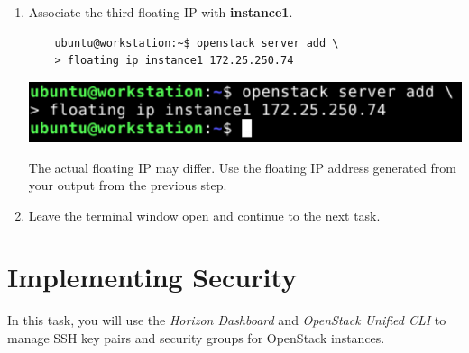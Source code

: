 \documentclass[letterpaper, 12pt]{article}
\begin{document}
\begin{enumerate}
    \item Associate the third floating IP with \textbf{instance1}.
    \begin{lstlisting}
    ubuntu@workstation:~$ openstack server add \
    > floating ip instance1 172.25.250.74
    \end{lstlisting}

    \begin{center}
        \includegraphics[width=\linewidth]{images/part3/step15.png}
    \end{center}

    \begin{notebox}
        The actual floating IP may differ. Use the floating IP address generated from your output from the previous
        step.
    \end{notebox}

    \item Leave the terminal window open and continue to the next task.

\end{enumerate}

\section{Implementing Security}
\label{sec:implementing_security}
In this task, you will use the \textit{Horizon Dashboard} and \textit{OpenStack Unified CLI} to manage SSH key pairs and
security groups for OpenStack instances.
\end{document}
